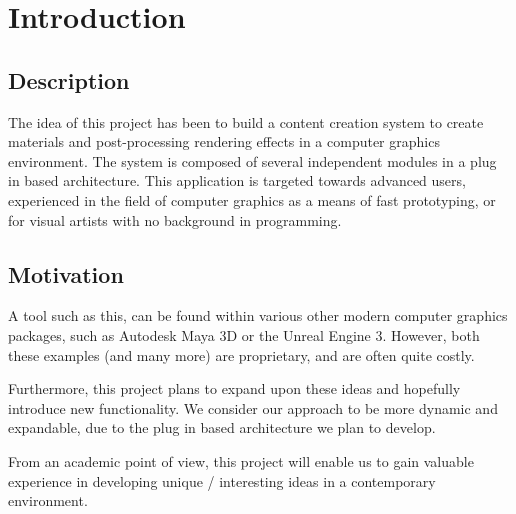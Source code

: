 \chapter{Introduction}
 
 \section{Description}
The idea of this project has been to build a content creation system to create materials and post-processing rendering effects in a computer graphics environment. The system is composed of several independent modules in a plug in based architecture. This application is targeted towards advanced users, experienced in the field of computer graphics as a means of fast prototyping, or for visual artists with no background in programming.

\section{Motivation}
A tool such as this, can be found within various other modern computer graphics packages, such as Autodesk Maya 3D or the Unreal Engine 3. However, both these examples (and many more) are proprietary, and are often quite costly. 
 
Furthermore, this project plans to expand upon these ideas and hopefully introduce new functionality. We consider our approach to be more dynamic and expandable, due to the plug in based architecture we plan to develop. 
 
From an academic point of view, this project will enable us to gain valuable experience in developing unique / interesting ideas in a contemporary environment. 
 